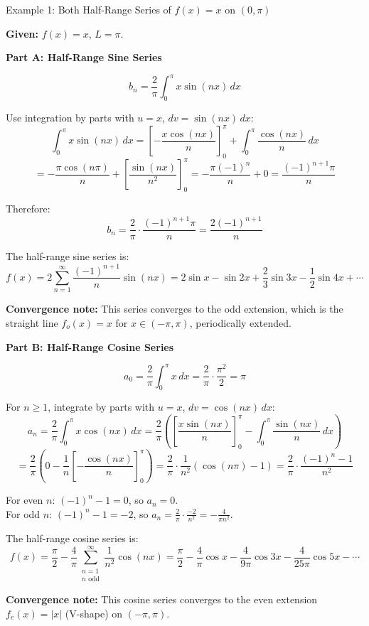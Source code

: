 \documentclass[12pt,a4paper]{article}
\begin{document}
\begin{infobox}{Example 1: Both Half-Range Series of $f(x)=x$ on $(0,\pi)$}

\textbf{Given:} $f(x) = x$, $L = \pi$.

\vspace{0.5em}
\textbf{Part A: Half-Range Sine Series}

\[
  b_n = \frac{2}{\pi}\int_0^{\pi} x\sin(nx)\,dx
\]

Use integration by parts with $u = x$, $dv = \sin(nx)\,dx$:
\[
  \int_0^{\pi} x\sin(nx)\,dx = \left[-\frac{x\cos(nx)}{n}\right]_0^{\pi} + \int_0^{\pi}\frac{\cos(nx)}{n}\,dx
\]
\[
  = -\frac{\pi\cos(n\pi)}{n} + \left[\frac{\sin(nx)}{n^2}\right]_0^{\pi}
  = -\frac{\pi(-1)^n}{n} + 0
  = \frac{(-1)^{n+1}\pi}{n}
\]

Therefore:
\[
  b_n = \frac{2}{\pi}\cdot\frac{(-1)^{n+1}\pi}{n} = \frac{2(-1)^{n+1}}{n}
\]

The half-range sine series is:
\[
  f(x) = 2\sum_{n=1}^{\infty} \frac{(-1)^{n+1}}{n}\sin(nx)
  = 2\sin x - \sin 2x + \frac{2}{3}\sin 3x - \frac{1}{2}\sin 4x + \cdots
\]

\textbf{Convergence note:} This series converges to the odd extension, which is the straight line $f_o(x)=x$ for $x\in(-\pi,\pi)$, periodically extended.

\vspace{0.5em}
\textbf{Part B: Half-Range Cosine Series}

\[
  a_0 = \frac{2}{\pi}\int_0^{\pi} x\,dx = \frac{2}{\pi}\cdot\frac{\pi^2}{2} = \pi
\]

For $n \geq 1$, integrate by parts with $u = x$, $dv = \cos(nx)\,dx$:
\[
  a_n = \frac{2}{\pi}\int_0^{\pi} x\cos(nx)\,dx
  = \frac{2}{\pi}\left(\left[\frac{x\sin(nx)}{n}\right]_0^{\pi} - \int_0^{\pi}\frac{\sin(nx)}{n}\,dx\right)
\]
\[
  = \frac{2}{\pi}\left(0 - \frac{1}{n}\left[-\frac{\cos(nx)}{n}\right]_0^{\pi}\right)
  = \frac{2}{\pi}\cdot\frac{1}{n^2}(\cos(n\pi)-1)
  = \frac{2}{\pi}\cdot\frac{(-1)^n - 1}{n^2}
\]

For even $n$: $(-1)^n - 1 = 0$, so $a_n = 0$.\\
For odd $n$: $(-1)^n - 1 = -2$, so $a_n = \frac{2}{\pi}\cdot\frac{-2}{n^2} = -\frac{4}{\pi n^2}$.

The half-range cosine series is:
\[
  f(x) = \frac{\pi}{2} - \frac{4}{\pi}\sum_{\substack{n=1 \\ n\text{ odd}}}^{\infty}\frac{1}{n^2}\cos(nx)
  = \frac{\pi}{2} - \frac{4}{\pi}\cos x - \frac{4}{9\pi}\cos 3x - \frac{4}{25\pi}\cos 5x - \cdots
\]

\textbf{Convergence note:} This cosine series converges to the even extension $f_e(x) = |x|$ (V-shape) on $(-\pi,\pi)$.
\end{infobox}
\end{document}
